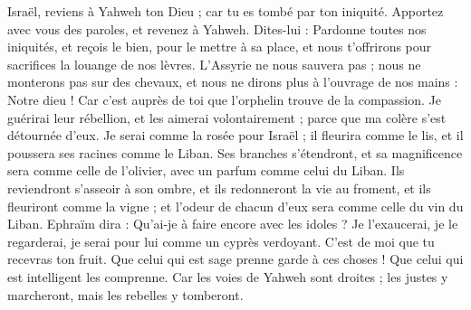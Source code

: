 \begin{multicols}{2}
\VerseOne{}Israël, reviens à Yahweh ton Dieu ; car tu es tombé par ton iniquité.
Apportez avec vous des paroles, et revenez à Yahweh. Dites-lui : Pardonne toutes nos iniquités, et reçois le bien, pour le mettre à sa place, et nous t’offrirons pour sacrifices la louange de nos lèvres.
L'Assyrie ne nous sauvera pas ; nous ne monterons pas sur des chevaux, et nous ne dirons plus à l'ouvrage de nos mains : Notre dieu ! Car c’est auprès de toi que l'orphelin trouve de la compassion.
Je guérirai leur rébellion, et les aimerai volontairement ; parce que ma colère s'est détournée d’eux.
Je serai comme la rosée pour Israël ; il fleurira comme le lis, et il poussera ses racines comme le Liban.
Ses branches s’étendront, et sa magnificence sera comme celle de l'olivier, avec un parfum comme celui du Liban.
Ils reviendront s’asseoir à son ombre, et ils redonneront la vie au froment, et ils fleuriront comme la vigne ; et l'odeur de chacun d'eux sera comme celle du vin du Liban.
Ephraïm dira : Qu'ai-je à faire encore avec les idoles ? Je l'exaucerai, je le regarderai, je serai pour lui comme un cyprès verdoyant. C’est de moi que tu recevras ton fruit.
Que celui qui est sage prenne garde à ces choses ! Que celui qui est intelligent les comprenne. Car les voies de Yahweh sont droites ; les justes y marcheront, mais les rebelles y tomberont.
\PPE{}
\end{multicols}
